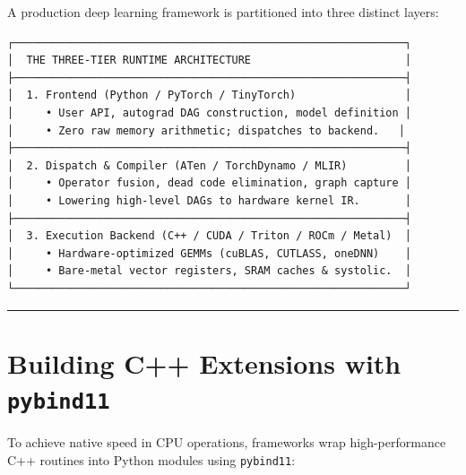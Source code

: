 \documentclass[
  letterpaper,
]{scrbook}
\begin{document}
A production deep learning framework is partitioned into three distinct
layers:

\begin{verbatim}
┌─────────────────────────────────────────────────────────────┐
│  THE THREE-TIER RUNTIME ARCHITECTURE                        │
├─────────────────────────────────────────────────────────────┤
│  1. Frontend (Python / PyTorch / TinyTorch)                 │
│     • User API, autograd DAG construction, model definition │
│     • Zero raw memory arithmetic; dispatches to backend.   │
├─────────────────────────────────────────────────────────────┤
│  2. Dispatch & Compiler (ATen / TorchDynamo / MLIR)         │
│     • Operator fusion, dead code elimination, graph capture │
│     • Lowering high-level DAGs to hardware kernel IR.       │
├─────────────────────────────────────────────────────────────┤
│  3. Execution Backend (C++ / CUDA / Triton / ROCm / Metal)  │
│     • Hardware-optimized GEMMs (cuBLAS, CUTLASS, oneDNN)    │
│     • Bare-metal vector registers, SRAM caches & systolic.  │
└─────────────────────────────────────────────────────────────┘
\end{verbatim}

\begin{center}\rule{0.5\linewidth}{0.5pt}\end{center}

\section{\texorpdfstring{Building C++ Extensions with
\texttt{pybind11}}{Building C++ Extensions with pybind11}}\label{building-c-extensions-with-pybind11}

To achieve native speed in CPU operations, frameworks wrap
high-performance C++ routines into Python modules using
\texttt{pybind11}:
\end{document}
